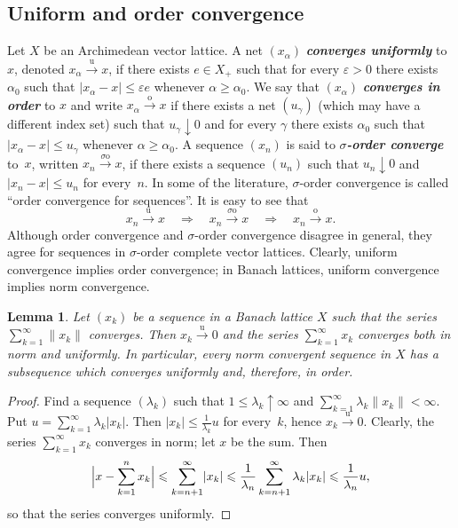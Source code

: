 \documentclass[12pt]{amsart}
\theoremstyle{plain}
\newtheorem{lemma}[theorem]{Lemma}
\theoremstyle{definition}
\newcommand{\abs}[1]{\lvert#1\rvert}
\newcommand{\norm}[1]{\lVert#1\rVert}
\newcommand{\Bigabs}[1]{\Bigl\lvert#1\Bigr\rvert}
\newcommand{\term}[1]{{\textit{\textbf{#1}}}}   %
\newcommand{\goeso}{\xrightarrow{\mathrm{o}}}	%
\newcommand{\goesso}{\xrightarrow{\sigma\mathrm{o}}}	%
\newcommand{\goesu}{\xrightarrow{\mathrm{u}}} %
\newcommand{\s}{\sum_{k=1}^\infty}
\renewcommand{\le}{\leqslant}
\renewcommand{\ge}{\geqslant}
\begin{document}
\subsection*{Uniform and order convergence}
Let $X$ be an Archimedean vector lattice. A net $(x_\alpha)$
\term{converges uniformly} to~$x$, denoted $x_\alpha\goesu x$, if
there exists $e\in X_+$ such that for every $\varepsilon>0$ there
exists $\alpha_0$ such that $\abs{x_\alpha-x}\le\varepsilon e$
whenever $\alpha\ge\alpha_0$. We say that $(x_\alpha)$ \term{converges
  in order} to $x$ and write $x_\alpha\goeso x$ if there exists a net
$(u_\gamma)$ (which may have a different index set) such that
$u_\gamma\downarrow 0$ and for every $\gamma$ there exists $\alpha_0$
such that $\abs{x_\alpha-x}\le u_\gamma$ whenever
$\alpha\ge\alpha_0$. A sequence $(x_n)$ is said to
\term{$\sigma$-order converge} to~$x$, written $x_n\goesso x$, if
there exists a sequence $(u_n)$ such that $u_n\downarrow 0$ and
$\abs{x_n-x}\le u_n$ for every~$n$. In some of the literature,
$\sigma$-order convergence is called ``order convergence for
sequences''. It is easy to see that
\begin{displaymath}
  x_n\goesu x\quad\Rightarrow\quad
  x_n\goesso x\quad\Rightarrow\quad
  x_n\goeso x.
\end{displaymath}
Although order convergence and $\sigma$-order convergence disagree in
general, they agree for sequences in $\sigma$-order complete vector
lattices.  Clearly, uniform convergence implies order convergence; in
Banach lattices, uniform convergence implies norm convergence.

\begin{lemma}\label{nconv-subseq}
  Let $(x_k)$ be a sequence in a Banach lattice $X$ such that the
  series $\s\norm{x_k}$ converges. Then $x_k\goesu 0$ and the series
  $\s x_k$ converges both in norm and uniformly. In
  particular, every norm convergent sequence in $X$ has a subsequence
  which converges uniformly and, therefore, in order.
\end{lemma}

\begin{proof}
  Find a sequence $(\lambda_k)$ such that
  $1\le\lambda_k\uparrow\infty$ and
  $\s\lambda_k\norm{x_k}<\infty$. Put $u=\s\lambda_k\abs{x_k}$. Then
  $\abs{x_k}\le\frac{1}{\lambda_k}u$ for every~$k$, hence
  $x_k\goesu 0$. Clearly, the series $\s x_k$ converges in norm; let
  $x$ be the sum. Then
  \begin{displaymath}
    \Bigabs{x-\sum_{k=1}^nx_k}\le\sum_{k=n+1}^\infty\abs{x_k}
    \le\frac{1}{\lambda_n}\sum_{k=n+1}^\infty\lambda_k\abs{x_k}
    \le\frac{1}{\lambda_n}u,
  \end{displaymath}
  so that the series converges uniformly.
\end{proof}
\end{document}

